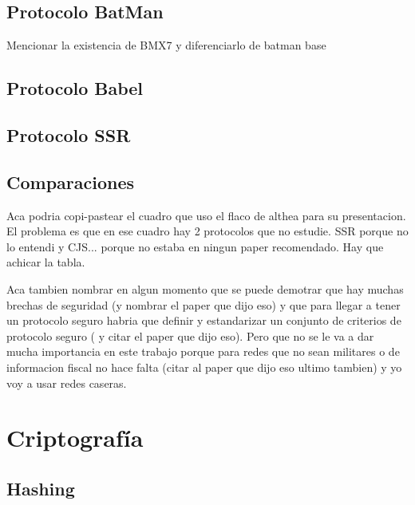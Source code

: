 \subsection{Protocolo BatMan}
\label{subseccionProtocoloBatman}

Mencionar la existencia de BMX7 y diferenciarlo de batman base

\subsection{Protocolo Babel}
\label{subseccionProtocoloBabel}

\subsection{Protocolo SSR}
\label{subseccionProtocoloSSR}

\subsection{Comparaciones}
\label{subseccionComparacionesProtocolosDeRuteo}
Aca podria copi-pastear el cuadro que uso el flaco de althea para su presentacion. El problema es que en ese cuadro hay 2 protocolos que no estudie. SSR porque no lo entendi y CJS... porque no estaba en ningun paper recomendado. Hay que achicar la tabla.

Aca tambien nombrar en algun momento que se puede demotrar que hay muchas brechas de seguridad (y nombrar el paper que dijo eso) y que para llegar a tener un protocolo seguro habria que definir y estandarizar un conjunto de criterios de protocolo seguro ( y citar el paper que dijo eso). Pero que no se le va a dar mucha importancia en este trabajo porque para redes que no sean militares o de informacion fiscal no hace falta (citar al paper que dijo eso ultimo tambien) y yo voy a usar redes caseras.

\section{Criptografía}

\subsection{Hashing}



